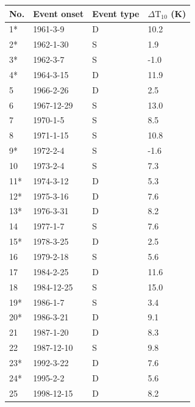 \begin{table}
\begin{centering}
    \begin{tabular}{|l|l|l|l|}  \hline
    No. & Event onset & Event type & $\Delta \mathrm{T}_{10}$ (K) \\ \hline
    1*  & 1961-3-9    & D          & 10.2        \\
    2*  & 1962-1-30   & S          & 1.9         \\
    3*  & 1962-3-7    & S          & -1.0        \\
    4*  & 1964-3-15   & D          & 11.9        \\
    5   & 1966-2-26   & D          & 2.5         \\
    6   & 1967-12-29  & S          & 13.0        \\
    7   & 1970-1-5    & S          & 8.5         \\
    8   & 1971-1-15   & S          & 10.8        \\
    9*  & 1972-2-4    & S          & -1.6        \\
    10  & 1973-2-4    & S          & 7.3         \\
    11* & 1974-3-12   & D          & 5.3         \\
    12* & 1975-3-16   & D          & 7.6         \\
    13* & 1976-3-31   & D          & 8.2         \\
    14  & 1977-1-7    & S          & 7.6         \\
    15* & 1978-3-25   & D          & 2.5         \\
    16  & 1979-2-18   & S          & 5.6         \\
    17  & 1984-2-25   & D          & 11.6        \\
    18  & 1984-12-25  & S          & 15.0        \\
    19* & 1986-1-7    & S          & 3.4         \\
    20* & 1986-3-21   & D          & 9.1         \\
    21  & 1987-1-20   & D          & 8.3         \\
    22  & 1987-12-10  & S          & 9.8         \\
    23* & 1992-3-22   & D          & 7.6         \\
    24* & 1995-2-2    & D          & 5.6         \\
    25  & 1998-12-15  & D          & 8.2         \\

\end{tabular}
\end{centering}
\end{table}
